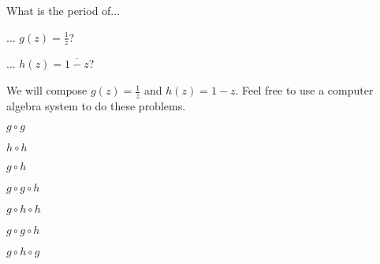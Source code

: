 \documentclass[../key.tex]{subfiles}
\begin{document}
\begin{outer_problem}
\item What is the period of...
\end{outer_problem}

\begin{inner_problem}[start=1]
\item ... $g(z)=\frac{1}{\overline{z}}$?
\end{inner_problem}

\begin{inner_problem}
\item ... $h(z)=\overline{1-z}$?
\end{inner_problem}

\begin{outer_problem}
\item We will compose $g(z)=\frac{1}{z}$ and $h(z)=1-z$. Feel free to use a computer algebra system to do these problems.
\end{outer_problem}

\begin{inner_problem}[start=1]
\item $g\circ g$
\end{inner_problem}

\begin{inner_problem}
\item $h\circ h$
\end{inner_problem}

\begin{inner_problem}
\item $g\circ h$
\end{inner_problem}

\begin{inner_problem}
\item $g\circ g\circ h$
\end{inner_problem}

\begin{inner_problem}
\item $g\circ h\circ h$
\end{inner_problem}

\begin{inner_problem}
\item $g\circ g\circ h$
\end{inner_problem}

\begin{inner_problem}
\item $g\circ h\circ g$
\end{inner_problem}
\end{document}
